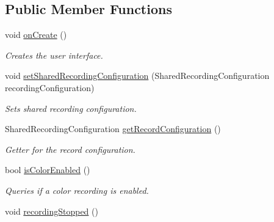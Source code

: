 \subsection*{Public Member Functions}
\begin{DoxyCompactItemize}
\item 
\hypertarget{class_record_tab_handler_a17ea59082d2d9e7638fffc96a9f0717b}{}void \hyperlink{class_record_tab_handler_a17ea59082d2d9e7638fffc96a9f0717b}{on\+Create} ()\label{class_record_tab_handler_a17ea59082d2d9e7638fffc96a9f0717b}

\begin{DoxyCompactList}\small\item\em Creates the user interface. \end{DoxyCompactList}\item 
void \hyperlink{class_record_tab_handler_a0c51292366cbd2519ca702505a9a3b2e}{set\+Shared\+Recording\+Configuration} (Shared\+Recording\+Configuration recording\+Configuration)
\begin{DoxyCompactList}\small\item\em Sets shared recording configuration. \end{DoxyCompactList}\item 
Shared\+Recording\+Configuration \hyperlink{class_record_tab_handler_a141be59e81660f5cf6cff7aa3e527ba8}{get\+Record\+Configuration} ()
\begin{DoxyCompactList}\small\item\em Getter for the record configuration. \end{DoxyCompactList}\item 
bool \hyperlink{class_record_tab_handler_a352050f9e525e107a39d202fe592aba4}{is\+Color\+Enabled} ()
\begin{DoxyCompactList}\small\item\em Queries if a color recording is enabled. \end{DoxyCompactList}\item 
\hypertarget{class_record_tab_handler_aaa359ad1668615eb6cbf96830f0a6ea6}{}void \hyperlink{class_record_tab_handler_aaa359ad1668615eb6cbf96830f0a6ea6}{recording\+Stopped} ()\label{class_record_tab_handler_aaa359ad1668615eb6cbf96830f0a6ea6}


\end{DoxyCompactItemize}
